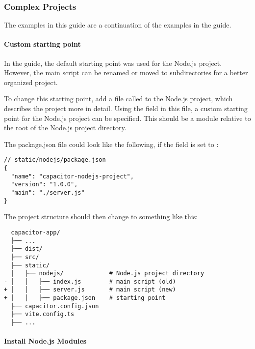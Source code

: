 \subsubsection{Complex Projects}
\label{sec:Capacitor-NodeJS:ComplexProjects}

The examples in this guide are a continuation of the examples in the  guide.

\paragraph{Custom starting point}
\label{sec:Capacitor-NodeJS:CustomStartingPoint}

In the  guide, the default starting point  was used for the Node.js project.
However, the main script can be renamed or moved to subdirectories for a better organized project.

To change this starting point, add a file called  to the Node.js project, which describes the project more in detail.
Using the  field in this file, a custom starting point for the Node.js project can be specified.
This should be a module relative to the root of the Node.js project directory.
\cite{npm}

The package.json file could look like the following, if the  field is set to :

\begin{verbatim}
// static/nodejs/package.json
{
  "name": "capacitor-nodejs-project",
  "version": "1.0.0",
  "main": "./server.js"
}
\end{verbatim}

The project structure should then change to something like this:

\begin{verbatim}
  capacitor-app/
  ├── ...
  ├── dist/
  ├── src/
  ├── static/
  │   ├── nodejs/             # Node.js project directory
- │   │   ├── index.js        # main script (old)
+ │   │   ├── server.js       # main script (new)
+ │   │   ├── package.json    # starting point
  ├── capacitor.config.json
  ├── vite.config.ts
  ├── ...
\end{verbatim}

\newpage

\paragraph{Install Node.js Modules}
\label{sec:Capacitor-NodeJS:InstallModules}

